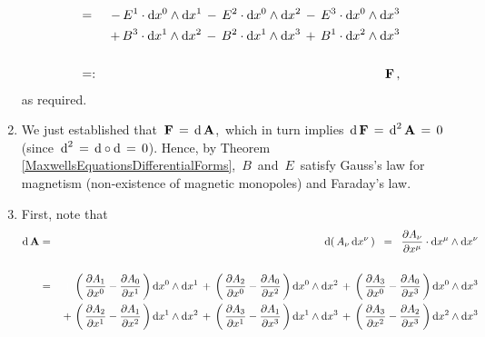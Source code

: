 \begin{enumerate}
\begin{eqnarray*}
	\\ \\
	& = &
		\,-\,
		E^{1} \cdot \textnormal{d} x^{0} \wedge \textnormal{d} x^{1}
		\,-\,
		E^{2} \cdot \textnormal{d} x^{0} \wedge \textnormal{d} x^{2}
		\,-\,
		E^{3} \cdot \textnormal{d} x^{0} \wedge \textnormal{d} x^{3}
	\\
	&&
		\,+\,
		B^{3} \cdot \textnormal{d} x^{1} \wedge \textnormal{d} x^{2}
		\,-\,
		B^{2} \cdot \textnormal{d} x^{1} \wedge \textnormal{d} x^{3}
		\,+\,
		B^{1} \cdot \textnormal{d} x^{2} \wedge \textnormal{d} x^{3}
	\\ \\
	& =: &
		\mathbf{F}\,,
	\end{eqnarray*}
	as required.
\item
	We just established that
	\,$\mathbf{F} \, = \, \textnormal{d}\,\mathbf{A}$,\,
	which in turn implies
	\,$\textnormal{d}\,\mathbf{F} \, = \, \textnormal{d}^{2}\,\mathbf{A} \, = \, 0$\,
	(since \,$\textnormal{d}^{2} \, = \, \textnormal{d} \circ \textnormal{d} \, = \, 0$).
	Hence, by Theorem \ref{MaxwellsEquationsDifferentialForms},
	\,$B$\, and \,$E$\, satisfy
	Gauss's law for magnetism (non-existence of magnetic monopoles) and Faraday's law.
\item
	First, note that
	\begin{eqnarray*}
	\d\,\mathbf{A}
	& = &
		\d\!\left(\,A_{\nu}\,\d x^{\nu}\,\right)
	\;\; = \;\;
		\dfrac{\partial A_{\nu}}{\partial x^{\mu}} \cdot \d x^{\mu} \wedge \d x^{\nu}
	\\ \\
	& = &
		\,{\color{white}+}\,
		\left(\,\dfrac{\partial A_{1}}{\partial x^{0}} - \dfrac{\partial A_{0}}{\partial x^{1}}\,\right)\d x^{0} \wedge \d x^{1}
		\,+\,
		\left(\,\dfrac{\partial A_{2}}{\partial x^{0}} - \dfrac{\partial A_{0}}{\partial x^{2}}\,\right)\d x^{0} \wedge \d x^{2}
		\,+\,
		\left(\,\dfrac{\partial A_{3}}{\partial x^{0}} - \dfrac{\partial A_{0}}{\partial x^{3}}\,\right)\d x^{0} \wedge \d x^{3}
	\\
	&&
		\,+\,
		\left(\,\dfrac{\partial A_{2}}{\partial x^{1}} - \dfrac{\partial A_{1}}{\partial x^{2}}\,\right)\d x^{1} \wedge \d x^{2}
		\,+\,
		\left(\,\dfrac{\partial A_{3}}{\partial x^{1}} - \dfrac{\partial A_{1}}{\partial x^{3}}\,\right)\d x^{1} \wedge \d x^{3}
		\,+\,
		\left(\,\dfrac{\partial A_{3}}{\partial x^{2}} - \dfrac{\partial A_{2}}{\partial x^{3}}\,\right)\d x^{2} \wedge \d x^{3}

\end{eqnarray*}
\end{enumerate}
